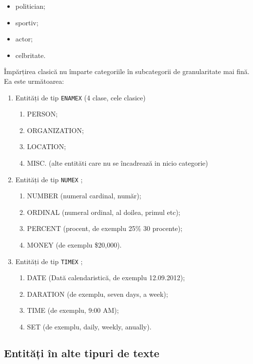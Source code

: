 \begin{itemize}
\item politician;
\item sportiv;
\item actor;
\item celbritate.
\end{itemize}


Împărțirea clasică nu împarte categoriile în subcategorii de granularitate mai fină. Ea este următoarea:

\begin{enumerate}
	\item Entități de tip \texttt{ENAMEX} (4 clase, cele clasice)
	\begin{enumerate}
		\item PERSON;
		\item ORGANIZATION;
		\item LOCATION;
		\item MISC. (alte entităti care nu se încadrează in nicio categorie)
	\end{enumerate}


	\item Entități de tip \texttt{NUMEX} ;

	\begin{enumerate}
		\item NUMBER (numeral cardinal, număr);
		\item ORDINAL (numeral ordinal, al doilea, primul etc);
		\item PERCENT (procent, de exemplu 25\% 30 procente);
		\item MONEY (de exemplu \$20,000).
	\end{enumerate}
	
		\item Entități de tip \texttt{TIMEX} ;
	
		\begin{enumerate}
			\item DATE (Dată calendaristică, de exemplu 12.09.2012);
			\item DARATION (de exemplu, seven days, a week);
			\item TIME (de exemplu, 9:00 AM);
			\item SET (de exemplu, daily, weekly, anually).
		\end{enumerate}


\end{enumerate}

\subsection{Entități în alte tipuri de texte}

